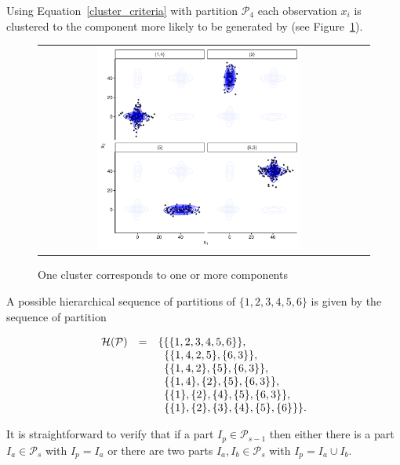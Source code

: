 \documentclass[10pt, a4paper]{article}
\begin{document}
\begin{spacing}{1.9}
Using Equation~\ref{cluster_criteria} with partition $\mathcal{P}_4$ each observation $x_i$ is clustered to the component more likely to be generated by (see Figure~\ref{ex_two_one}).

\begin{figure}[h]
\begin{center}
\begin{tabular}{cc}
  \includegraphics[width=0.65\textwidth]{figures/partition-example-part4.pdf} \\
 \end{tabular}
 \caption{One cluster corresponds to one or more components}\label{ex_two_one}
\end{center}
\end{figure}


A possible hierarchical sequence of partitions of $\{1, 2, 3, 4, 5, 6\}$ is given by the sequence of partition

\begin{equation}
\begin{array}{r c l}
\mathcal{H}(\mathcal{P}) &=& \{ \{\{1, 2, 3, 4, 5, 6\}\}, \\
   & & \;\; \{ \{1, 4, 2, 5\}, \{6, 3\} \},  \\
    & & \;\; \{ \{1, 4, 2\}, \{5\}, \{6, 3\} \}, \\
   & & \;\; \{ \{1, 4\},\{2\}, \{5\}, \{6, 3\} \}, \\
   & & \;\;  \{\{1\},\{2\},\{4\},\{5\},\{6,3\} \},\\
   & &  \;\;  \{\{1\},\{2\},\{3\},\{4\},\{5\},\{6\}\} \}.
\end{array}
\label{hier_ex}
\end{equation}

It is straightforward to verify that if a part $I_p \in \mathcal{P}_{s-1}$ then either there is a part $I_a \in \mathcal{P}_{s}$ with $I_p = I_a$ or there are two parts $I_a, I_b \in \mathcal{P}_s$ with $I_p = I_a \cup I_b$.



\end{spacing}
\end{document}

